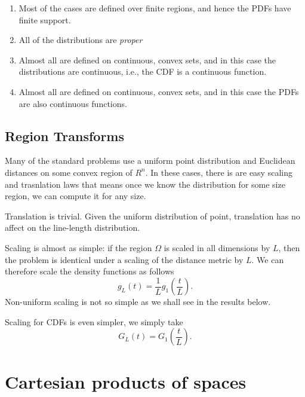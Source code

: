 \documentclass{article}
\begin{document}
\begin{enumerate}

\item Most of the cases are defined over finite regions, and hence the
  PDFs have finite support.

\item All of the distributions are {\em proper}

\item Almost all are defined on continuous, convex sets, and in this
  case the distributions are continuous, i.e., the CDF is a continuous
  function.

\item Almost all are defined on continuous, convex sets, and in this
  case the PDFs are also continuous functions.

\end{enumerate}

\subsection{Region Transforms}
\label{sec:scaling}

Many of the standard problems use a uniform point distribution and
Euclidean distances on some convex region of $R^n$. In these cases,
there is are easy scaling and trasnlation laws that means once we know
the distribution for some size region, we can compute it for any size.

Translation is trivial. Given the uniform distribution of point,
translation has no affect on the line-length distribution.

Scaling is almost as simple: if the region $\Omega$ is scaled in all
dimensions by $L$, then the problem is identical under a scaling of
the distance metric by $L$. We can therefore scale the density
functions as follows
\begin{equation}
   g_L(t) = \frac{1}{L} g_1 \left( \frac{t}{L} \right). 
\end{equation}
Non-uniform scaling is not so simple as we shall see in the results
below.

Scaling for CDFs is even simpler, we simply take
\begin{equation}
   G_L(t) = G_1 \left( \frac{t}{L} \right). 
\end{equation}


\section{Cartesian products of spaces}
\end{document}
